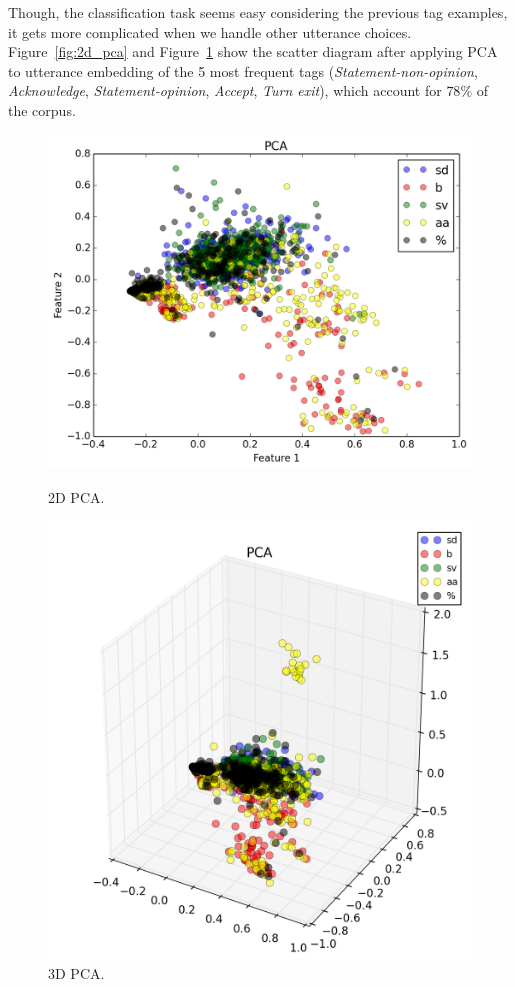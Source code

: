 Though, the classification task seems easy considering the previous tag examples, it gets more complicated when we handle other utterance choices. Figure~\ref{fig:2d_pca} and Figure~\ref{fig:3d_pca} show the scatter diagram after applying PCA to utterance embedding of the 5 most frequent tags (\emph{Statement-non-opinion}, \emph{Acknowledge}, \emph{Statement-opinion}, \emph{Accept}, \emph{Turn exit}), which account for $78\%$ of the corpus.

\begin{figure}
\centering
\begin{minipage}{.23\textwidth}
\includegraphics[width=1\textwidth]{img/complex_pca_2d}
\caption{2D PCA.}
\label{fig:2d_pca}
\end{minipage}
\begin{minipage}{.23\textwidth}
\includegraphics[width=1\textwidth]{img/complex_pca_3d}
\caption{3D PCA.}
\label{fig:3d_pca}
\end{minipage}
\end{figure}